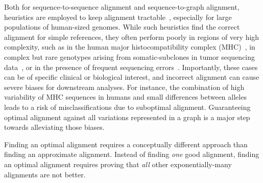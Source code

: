 Both for sequence-to-sequence alignment and sequence-to-graph alignment,
heuristics are employed to keep alignment
tractable~\cite{altschul_basic_1990,langmead_fast_2012,garrison_variation_2018},
especially for large populations of human-sized genomes.
%
While such heuristics find the correct alignment for simple references, they
often perform poorly in regions of very high complexity, such as in the human
major histocompatibility complex (MHC)~\cite{dilthey_improved_2015}, in complex
but rare genotypes arising from somatic-subclones in tumor sequencing
data~\cite{harismendy_detection_2011}, or in the presence of frequent sequencing
errors~\cite{salmela_lordec_2014}.
%
Importantly, these cases can be of specific clinical or biological interest, and
incorrect alignment can cause severe biases for downstream analyses. For
instance, the combination of high variability of MHC sequences in humans and
small differences between alleles~\cite{buhler_hla_2011} leads to a risk of
misclassifications due to suboptimal alignment. Guaranteeing optimal alignment
against all variations represented in a graph is a major step towards
alleviating those biases.

Finding an optimal alignment requires a conceptually different approach than
finding an approximate alignment. Instead of finding \emph{one} good alignment,
finding an optimal alignment requires proving that \emph{all} other
exponentially-many alignments are not better.

